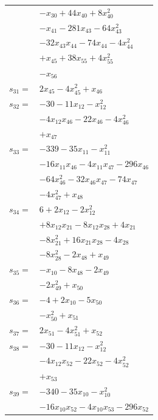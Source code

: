 \begin{longtable}{@{}r@{\;}l@{}}
 & \(\displaystyle -x_{30} +44x_{40} +8x_{40}^{2}\) \\
 & \(\displaystyle -x_{41} -281x_{43} -64x_{43}^{2}\) \\
 & \(\displaystyle -32x_{43}x_{44} -74x_{44} -4x_{44}^{2}\) \\
 & \(\displaystyle +x_{45} +38x_{55} +4x_{55}^{2}\) \\
 & \(\displaystyle -x_{56}\) \\[3pt]
\(s_{31}=\) & \(\displaystyle 2x_{45} -4x_{45}^{2} +x_{46}\) \\[3pt]
\(s_{32}=\) & \(\displaystyle -30 -11x_{12} -x_{12}^{2}\) \\
 & \(\displaystyle -4x_{12}x_{46} -22x_{46} -4x_{46}^{2}\) \\
 & \(\displaystyle +x_{47}\) \\[3pt]
\(s_{33}=\) & \(\displaystyle -339 -35x_{11} -x_{11}^{2}\) \\
 & \(\displaystyle -16x_{11}x_{46} -4x_{11}x_{47} -296x_{46}\) \\
 & \(\displaystyle -64x_{46}^{2} -32x_{46}x_{47} -74x_{47}\) \\
 & \(\displaystyle -4x_{47}^{2} +x_{48}\) \\[3pt]
\(s_{34}=\) & \(\displaystyle 6 +2x_{12} -2x_{12}^{2}\) \\
 & \(\displaystyle +8x_{12}x_{21} -8x_{12}x_{28} +4x_{21}\) \\
 & \(\displaystyle -8x_{21}^{2} +16x_{21}x_{28} -4x_{28}\) \\
 & \(\displaystyle -8x_{28}^{2} -2x_{48} +x_{49}\) \\[3pt]
\(s_{35}=\) & \(\displaystyle -x_{10} -8x_{48} -2x_{49}\) \\
 & \(\displaystyle -2x_{49}^{2} +x_{50}\) \\[3pt]
\(s_{36}=\) & \(\displaystyle -4 +2x_{10} -5x_{50}\) \\
 & \(\displaystyle -x_{50}^{2} +x_{51}\) \\[3pt]
\(s_{37}=\) & \(\displaystyle 2x_{51} -4x_{51}^{2} +x_{52}\) \\[3pt]
\(s_{38}=\) & \(\displaystyle -30 -11x_{12} -x_{12}^{2}\) \\
 & \(\displaystyle -4x_{12}x_{52} -22x_{52} -4x_{52}^{2}\) \\
 & \(\displaystyle +x_{53}\) \\[3pt]
\(s_{39}=\) & \(\displaystyle -340 -35x_{10} -x_{10}^{2}\) \\
 & \(\displaystyle -16x_{10}x_{52} -4x_{10}x_{53} -296x_{52}\) \\

\end{longtable}
